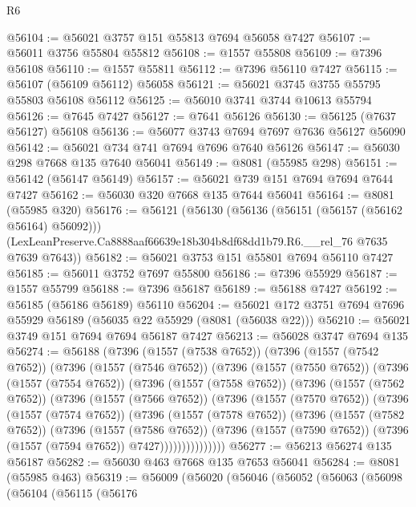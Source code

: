 \begin{lexlean}{R6}
\begin{coremodule}
@56104 := @56021 @3757 @151 @55813 @7694 @56058 @7427
@56107 := @56011 @3756 @55804 @55812
@56108 := @1557 @55808
@56109 := @7396 @56108
@56110 := @1557 @55811
@56112 := @7396 @56110 @7427
@56115 := @56107 (@56109 @56112) @56058
@56121 := @56021 @3745 @3755 @55795 @55803 @56108 @56112
@56125 := @56010 @3741 @3744 @10613 @55794
@56126 := @7645 @7427
@56127 := @7641 @56126
@56130 := @56125 (@7637 @56127) @56108
@56136 := @56077 @3743 @7694 @7697 @7636 @56127 @56090
@56142 := @56021 @734 @741 @7694 @7696 @7640 @56126
@56147 := @56030 @298 @7668 @135 @7640 @56041
@56149 := @8081 (@55985 @298)
@56151 := @56142 (@56147 @56149)
@56157 := @56021 @739 @151 @7694 @7694 @7644 @7427
@56162 := @56030 @320 @7668 @135 @7644 @56041
@56164 := @8081 (@55985 @320)
@56176 := @56121
    (@56130
      (@56136 (@56151 (@56157 (@56162 @56164) @56092)))
      (LexLeanPreserve.Ca8888aaf66639e18b304b8df68dd1b79.R6.__rel_76 @7635 @7639 @7643))
@56182 := @56021 @3753 @151 @55801 @7694 @56110 @7427
@56185 := @56011 @3752 @7697 @55800
@56186 := @7396 @55929
@56187 := @1557 @55799
@56188 := @7396 @56187
@56189 := @56188 @7427
@56192 := @56185 (@56186 @56189) @56110
@56204 := @56021 @172 @3751 @7694 @7696 @55929 @56189 (@56035 @22 @55929 (@8081 (@56038 @22)))
@56210 := @56021 @3749 @151 @7694 @7694 @56187 @7427
@56213 := @56028 @3747 @7694 @135
@56274 := @56188
    (@7396
      (@1557 (@7538 @7652))
      (@7396
        (@1557 (@7542 @7652))
        (@7396
          (@1557 (@7546 @7652))
          (@7396
            (@1557 (@7550 @7652))
            (@7396
              (@1557 (@7554 @7652))
              (@7396
                (@1557 (@7558 @7652))
                (@7396
                  (@1557 (@7562 @7652))
                  (@7396
                    (@1557 (@7566 @7652))
                    (@7396
                      (@1557 (@7570 @7652))
                      (@7396
                        (@1557 (@7574 @7652))
                        (@7396
                          (@1557 (@7578 @7652))
                          (@7396
                            (@1557 (@7582 @7652))
                            (@7396
                              (@1557 (@7586 @7652))
                              (@7396
                                (@1557 (@7590 @7652))
                                (@7396 (@1557 (@7594 @7652)) @7427)))))))))))))))
@56277 := @56213 @56274 @135 @56187
@56282 := @56030 @463 @7668 @135 @7653 @56041
@56284 := @8081 (@55985 @463)
@56319 := @56009
    (@56020
      (@56046
        (@56052
          (@56063
            (@56098
              (@56104
                (@56115
                  (@56176

\end{coremodule}
\end{lexlean}
